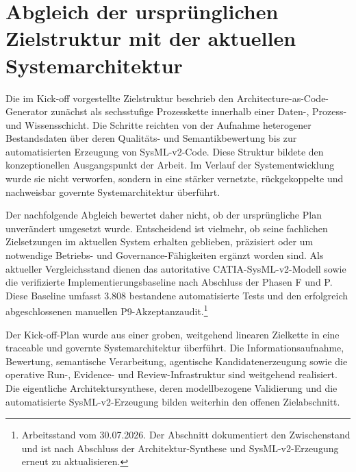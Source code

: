 
\section{Abgleich der ursprünglichen Zielstruktur mit der aktuellen Systemarchitektur}
\label{sec:kickoff_systemabgleich}

Die im Kick-off vorgestellte Zielstruktur beschrieb den Architecture-as-Code-Generator zunächst als sechsstufige Prozesskette innerhalb einer Daten-, Prozess- und Wissensschicht. Die Schritte reichten von der Aufnahme heterogener Bestandsdaten über deren Qualitäts- und Semantikbewertung bis zur automatisierten Erzeugung von SysML-v2-Code. Diese Struktur bildete den konzeptionellen Ausgangspunkt der Arbeit. Im Verlauf der Systementwicklung wurde sie nicht verworfen, sondern in eine stärker vernetzte, rückgekoppelte und nachweisbar governte Systemarchitektur überführt.

Der nachfolgende Abgleich bewertet daher nicht, ob der ursprüngliche Plan unverändert umgesetzt wurde. Entscheidend ist vielmehr, ob seine fachlichen Zielsetzungen im aktuellen System erhalten geblieben, präzisiert oder um notwendige Betriebs- und Governance-Fähigkeiten ergänzt worden sind. Als aktueller Vergleichsstand dienen das autoritative CATIA-SysML-v2-Modell sowie die verifizierte Implementierungsbaseline nach Abschluss der Phasen F und P. Diese Baseline umfasst 3.808 bestandene automatisierte Tests und den erfolgreich abgeschlossenen manuellen P9-Akzeptanzaudit.\footnote{Arbeitsstand vom 30.07.2026. Der Abschnitt dokumentiert den Zwischenstand und ist nach Abschluss der Architektur-Synthese und SysML-v2-Erzeugung erneut zu aktualisieren.}

\begin{tcolorbox}[
  enhanced,
  breakable,
  colback=blue!3,
  colframe=TuringBlue,
  title={Kernaussage des Abgleichs},
  fonttitle=\bfseries,
  boxrule=0.8pt,
  arc=2mm
]
Der Kick-off-Plan wurde aus einer groben, weitgehend linearen Zielkette in eine traceable und governte Systemarchitektur überführt. Die Informationsaufnahme, Bewertung, semantische Verarbeitung, agentische Kandidatenerzeugung sowie die operative Run-, Evidence- und Review-Infrastruktur sind weitgehend realisiert. Die eigentliche Architektursynthese, deren modellbezogene Validierung und die automatisierte SysML-v2-Erzeugung bilden weiterhin den offenen Zielabschnitt.
\end{tcolorbox}

